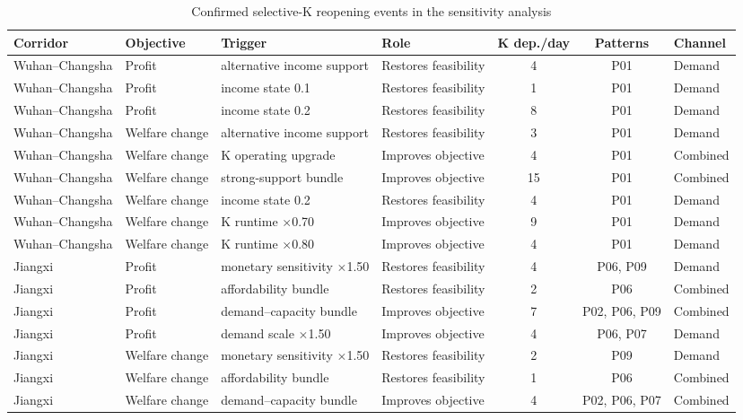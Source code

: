 \begin{table}[p]
\centering
\caption{Confirmed selective-K reopening events in the sensitivity analysis}\label{tab:k_reopening_events}
\begingroup
\scriptsize
\setlength{\tabcolsep}{0.35em}
\renewcommand{\arraystretch}{1.05}
\begin{tabular}{@{}p{}lp{}p{}ccl@{}}
\toprule
Corridor & Objective & Trigger & Role & K dep./day & Patterns & Channel \\
\midrule
Wuhan--Changsha & Profit & alternative income support & Restores feasibility & 4 & P01 & Demand \\
Wuhan--Changsha & Profit & income state 0.1 & Restores feasibility & 1 & P01 & Demand \\
Wuhan--Changsha & Profit & income state 0.2 & Restores feasibility & 8 & P01 & Demand \\
Wuhan--Changsha & Welfare change & alternative income support & Restores feasibility & 3 & P01 & Demand \\
Wuhan--Changsha & Welfare change & K operating upgrade & Improves objective & 4 & P01 & Combined \\
Wuhan--Changsha & Welfare change & strong-support bundle & Improves objective & 15 & P01 & Combined \\
Wuhan--Changsha & Welfare change & income state 0.2 & Restores feasibility & 4 & P01 & Demand \\
Wuhan--Changsha & Welfare change & K runtime $\times$0.70 & Improves objective & 9 & P01 & Demand \\
Wuhan--Changsha & Welfare change & K runtime $\times$0.80 & Improves objective & 4 & P01 & Demand \\
Jiangxi & Profit & monetary sensitivity $\times$1.50 & Restores feasibility & 4 & P06, P09 & Demand \\
Jiangxi & Profit & affordability bundle & Restores feasibility & 2 & P06 & Combined \\
Jiangxi & Profit & demand--capacity bundle & Improves objective & 7 & P02, P06, P09 & Combined \\
Jiangxi & Profit & demand scale $\times$1.50 & Improves objective & 4 & P06, P07 & Demand \\
Jiangxi & Welfare change & monetary sensitivity $\times$1.50 & Restores feasibility & 2 & P09 & Demand \\
Jiangxi & Welfare change & affordability bundle & Restores feasibility & 1 & P06 & Combined \\
Jiangxi & Welfare change & demand--capacity bundle & Improves objective & 4 & P02, P06, P07 & Combined \\

\end{tabular}
\end{table}
